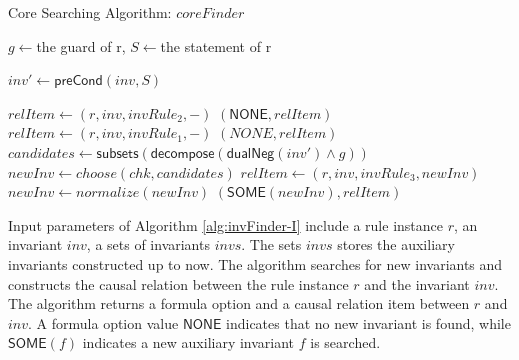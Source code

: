\documentclass[final]{IEEEtran}
\def \andc {\wedge }
\begin{document}
\begin{algorithm}

\caption{Core Searching Algorithm: $coreFinder$}\label{alg:invfinderI}



{
    $g\leftarrow $the guard of r, $S\leftarrow $the statement of r\;

    $inv'\leftarrow \mathsf{preCond}(inv, S)$\; \label{line:preCondComp}

    {
    $relItem\leftarrow (r, inv, invRule_2,-)$\;
    \Return $(\mathsf{NONE},  relItem )$\;
    }
    {
    $relItem\leftarrow (r, inv, invRule_1,-)$\;
    \Return $(NONE,  relItem )$\;
    }
    \Else
    {
    $candidates\leftarrow \mathsf{subsets}(\mathsf{decompose}(\mathsf{dualNeg}(inv')\andc g))$\;
    $newInv\leftarrow choose(chk,candidates)$\;
    $relItem\leftarrow (r, inv, invRule_3,newInv)$\;
    {
    $newInv \leftarrow  normalize(newInv)$\;%
    \Return $(\mathsf{SOME}(newInv),   relItem )$\;
    }
    }
}


\end{algorithm}



Input parameters of Algorithm \ref{alg:invFinder-I} include a rule instance $r$, an invariant $inv$, a sets of invariants $invs$.  The sets $invs$   stores the auxiliary invariants constructed up to now. The algorithm   searches for new invariants and    constructs the causal relation between the rule instance $r$ and the invariant $inv$.
The algorithm returns a formula option and a causal relation item between $r$ and $inv$. A formula option value $\mathsf{NONE}$ indicates that no new invariant is found, while $\mathsf{SOME}(f)$ indicates a new auxiliary invariant $f$ is searched.


%
\end{document}
